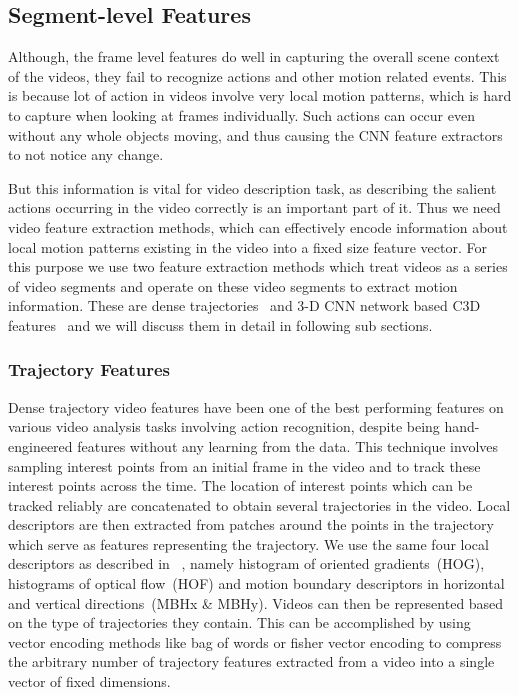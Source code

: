 \subsection{Segment-level Features}
Although, the frame level features do well in capturing the overall scene
context of the videos, they fail to recognize actions and other motion related
events.
This is because lot of action in videos involve very local motion patterns,
which is hard to capture when looking at frames individually.
Such actions can occur even without any whole objects moving, and thus causing
the CNN feature extractors to not notice any change.

But this information is vital for video description task, as describing the
salient actions occurring in the video correctly is an important part of it.
Thus we need video feature extraction methods, which can effectively encode
information about local motion patterns existing in the video into a fixed size
feature vector.
For this purpose we use two feature extraction methods which treat videos as a
series of video segments and operate on these video segments to extract motion
information.
These are dense trajectories~\cite{DBLP:conf/cvpr/WangKSL11, Wang2013} and 3-D CNN
network based C3D features~\cite{DBLP:C3D} and we will discuss them in detail in
following sub sections.

\subsubsection{Trajectory Features}

Dense trajectory video features have been one of the best performing features
on various video analysis tasks involving action recognition, despite being
hand-engineered features without any learning from the data.
This technique involves sampling interest points from an initial frame in the
video and to track these interest points across the time.
The location of interest points which can be tracked reliably are concatenated
to obtain several trajectories in the video.
Local descriptors are then extracted from patches around the points in the
trajectory which serve as features representing the trajectory.
We use the same four local descriptors as described in
~\cite{DBLP:conf/cvpr/WangKSL11, Wang2013}, namely histogram of oriented
gradients~(HOG), histograms of optical flow~(HOF) and motion boundary
descriptors in horizontal and vertical directions~(MBHx \& MBHy).
Videos can then be represented based on the type of trajectories they contain.
This can be accomplished by using vector encoding methods like bag of words or
fisher vector encoding to compress the arbitrary number of trajectory features
extracted from a video into a single vector of fixed dimensions.

